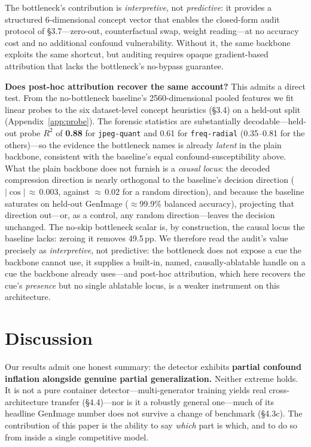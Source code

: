 The bottleneck's contribution is \emph{interpretive}, not \emph{predictive}: it provides a structured 6-dimensional concept vector that enables the closed-form audit protocol of \S{}3.7---zero-out, counterfactual swap, weight reading---at no accuracy cost and no additional confound vulnerability. Without it, the same backbone exploits the same shortcut, but auditing requires opaque gradient-based attribution that lacks the bottleneck's no-bypass guarantee.

\textbf{Does post-hoc attribution recover the same account?} This admits a direct test. From the no-bottleneck baseline's 2560-dimensional pooled features we fit linear probes to the six dataset-level concept heuristics (\S{}3.4) on a held-out split (Appendix~\ref{app:probe}). The forensic statistics are substantially decodable---held-out probe $R^2$ of \textbf{0.88} for \texttt{jpeg-quant} and 0.61 for \texttt{freq-radial} (0.35--0.81 for the others)---so the evidence the bottleneck names is already \emph{latent} in the plain backbone, consistent with the baseline's equal confound-susceptibility above. What the plain backbone does not furnish is a \emph{causal locus}: the decoded compression direction is nearly orthogonal to the baseline's decision direction ($|\cos|\,{\approx}\,0.003$, against ${\approx}\,0.02$ for a random direction), and because the baseline saturates on held-out GenImage ($\approx$99.9\% balanced accuracy), projecting that direction out---or, as a control, any random direction---leaves the decision unchanged. The no-skip bottleneck scalar is, by construction, the causal locus the baseline lacks: zeroing it removes 49.5\,pp. We therefore read the audit's value precisely as \emph{interpretive}, not predictive: the bottleneck does not expose a cue the backbone cannot use, it supplies a built-in, named, causally-ablatable handle on a cue the backbone already uses---and post-hoc attribution, which here recovers the cue's \emph{presence} but no single ablatable locus, is a weaker instrument on this architecture.

\section{Discussion}

Our results admit one honest summary: the detector exhibits \textbf{partial confound inflation alongside genuine partial generalization.} Neither extreme holds. It is not a pure container detector---multi-generator training yields real cross-architecture transfer (\S{}4.4)---nor is it a robustly general one---much of its headline GenImage number does not survive a change of benchmark (\S{}4.3c). The contribution of this paper is the ability to say \emph{which} part is which, and to do so from inside a single competitive model.


